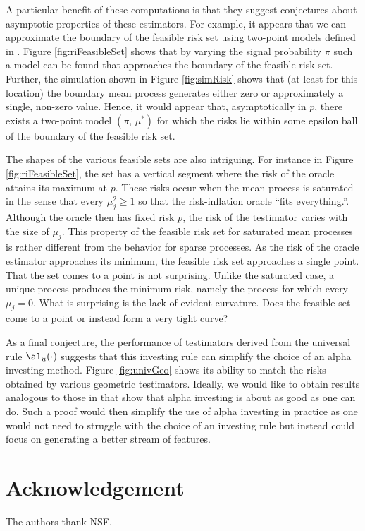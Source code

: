 \documentclass[12pt]{article}
\begin{document}
 A particular benefit of these computations is that they suggest conjectures
 about asymptotic properties of these estimators.  For example, it appears that
 we can approximate the boundary of the feasible risk set using two-point models
 defined in .  Figure \ref{fig:riFeasibleSet} shows that by varying
 the signal probability $\pi$ such a model can be found that approaches the
 boundary of the feasible risk set.  Further, the simulation shown in Figure
 \ref{fig:simRisk} shows that (at least for this location) the boundary mean
 process generates either zero or approximately a single, non-zero value.
  Hence, it would appear that, asymptotically in $p$, there exists a two-point
 model $(\pi,\,\mu^{*})$ for which the risks lie within some epsilon ball of the
 boundary of the feasible risk set.


 The shapes of the various feasible sets are also intriguing.  For instance in
 Figure \ref{fig:riFeasibleSet}, the set has a vertical segment where the risk
 of the oracle attains its maximum at $p$.  These risks occur when the mean
 process is saturated in the sense that every $\mu_j^2 \ge 1$ so that the
 risk-inflation oracle ``fits everything.''.  Although the oracle then has fixed
 risk $p$, the risk of the testimator varies with the size of $\mu_j$.  This
 property of the feasible risk set for saturated mean processes is rather
 different from the behavior for sparse processes.  As the risk of the oracle
 estimator approaches its minimum, the feasible risk set approaches a single
 point.  That the set comes to a point is not surprising.  Unlike the saturated
 case, a unique process produces the minimum risk, namely the process for which
 every $\mu_j = 0$.  What is surprising is the lack of evident curvature.  Does
 the feasible set come to a point or instead form a very tight curve?
 

 As a final conjecture, the performance of testimators derived from the
 universal rule $\al_u(\cdot)$ suggests that this investing rule can simplify
 the choice of an alpha investing method.  Figure \ref{fig:univGeo} shows its
 ability to match the risks obtained by various geometric testimators.  Ideally,
 we would like to obtain results analogous to those in \citet{rissanen83} that
 show that alpha investing is about as good as one can do.  Such a proof would
 then simplify the use of alpha investing in practice as one would not need to
 struggle with the choice of an investing rule but instead could focus on
 generating a better stream of features.


\section*{Acknowledgement}

The authors thank NSF.





\end{document}
